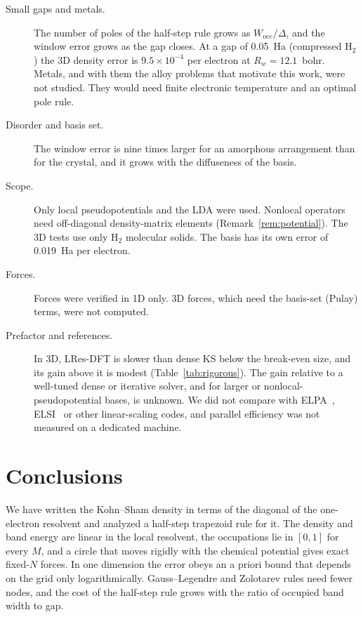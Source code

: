 \documentclass[aps,prb,twocolumn,superscriptaddress,floatfix,longbibliography]{revtex4-2}
\theoremstyle{remark}
\begin{document}
\begin{description}
\item[Small gaps and metals.] The number of poles of the half-step rule grows as $W_\mathrm{occ}/\Delta$, and the window
error grows as the gap closes. At a gap of 0.05~Ha (compressed H$_2$) the 3D density error is $9.5\times10^{-4}$ per electron
at $R_w=12.1$~bohr. Metals, and with them the alloy problems that motivate this work, were not studied. They would need
finite electronic temperature and an optimal pole rule.
\item[Disorder and basis set.] The window error is nine times larger for an amorphous arrangement than for the crystal,
and it grows with the diffuseness of the basis.
\item[Scope.] Only local pseudopotentials and the LDA were used. Nonlocal operators need off-diagonal density-matrix
elements (Remark~\ref{rem:potential}). The 3D tests use only H$_2$ molecular solids. The basis has its own error of
0.019~Ha per electron.
\item[Forces.] Forces were verified in 1D only. 3D forces, which need the basis-set (Pulay) terms, were not computed.
\item[Prefactor and references.] In 3D, LRes-DFT is slower than dense KS below the break-even size, and its gain above it is
modest (Table~\ref{tab:rigorous}). The gain relative to a well-tuned dense or iterative solver, and for larger or
nonlocal-pseudopotential bases, is unknown. We did not compare with ELPA~\cite{ELPA2014}, ELSI~\cite{ELSI2018} or other
linear-scaling codes, and parallel efficiency was not measured on a dedicated machine.
\end{description}

\section{Conclusions}

We have written the Kohn--Sham density in terms of the diagonal of the one-electron resolvent and analyzed a half-step
trapezoid rule for it. The density and band energy are linear in the local resolvent, the occupations lie in $[0,1]$ for
every $M$, and a circle that moves rigidly with the chemical potential gives exact fixed-$N$ forces. In one dimension the
error obeys an a priori bound that depends on the grid only logarithmically. Gauss--Legendre and Zolotarev rules need fewer
nodes, and the cost of the half-step rule grows with the ratio of occupied band width to gap.
\end{document}
